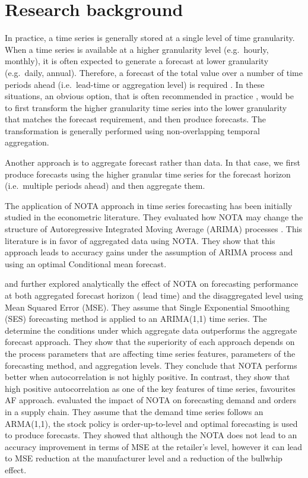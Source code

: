 \documentclass[preprint, 3p,
authoryear]{elsarticle} %
\begin{document}
\hypertarget{lit}{%
\section{Research background}\label{lit}}

In practice, a time series is generally stored at a single level of time
granularity. When a time series is available at a higher granularity
level (e.g.~hourly, monthly), it is often expected to generate a
forecast at lower granularity (e.g.~daily, annual). Therefore, a
forecast of the total value over a number of time periods ahead
(i.e.~lead-time or aggregation level) is required
\citep{mohammadipour2012forecast}. In these situations, an obvious
option, that is often recommended in practice \citep{goodwin2018profit},
would be to first transform the higher granularity time series into the
lower granularity that matches the forecast requirement, and then
produce forecasts. The transformation is generally performed using
non-overlapping temporal aggregation.

Another approach is to aggregate forecast rather than data. In that
case, we first produce forecasts using the higher granular time series
for the forecast horizon (i.e.~multiple periods ahead) and then
aggregate them.

The application of NOTA approach in time series forecasting has been
initially studied in the econometric literature. They evaluated how NOTA
may change the structure of Autoregressive Integrated Moving Average
(ARIMA) processes \citep{wei1978some, rossana1995temporal}. This
literature is in favor of aggregated data using NOTA. They show that
this approach leads to accuracy gains under the assumption of ARIMA
process and using an optimal Conditional mean forecast.

\citet{rostami2013demand} and \citet{rostami2014note} further explored
analytically the effect of NOTA on forecasting performance at both
aggregated forecast horizon ( lead time) and the disaggregated level
using Mean Squared Error (MSE). They assume that Single Exponential
Smoothing (SES) forecasting method is applied to an ARIMA(1,1) time
series. The determine the conditions under which aggregate data
outperforms the aggregate forecast approach. They show that the
superiority of each approach depends on the process parameters that are
affecting time series features, parameters of the forecasting method,
and aggregation levels. They conclude that NOTA performs better when
autocorrelation is not highly positive. In contrast, they show that high
positive autocorrelation as one of the key features of time series,
favourites AF approach. \citet{rostami2019impact} evaluated the impact
of NOTA on forecasting demand and orders in a supply chain. They assume
that the demand time series follows an ARMA(1,1), the stock policy is
order-up-to-level and optimal forecasting is used to produce forecasts.
They showed that although the NOTA does not lead to an accuracy
improvement in terms of MSE at the retailer's level, however it can lead
to MSE reduction at the manufacturer level and a reduction of the
bullwhip effect.
\end{document}
